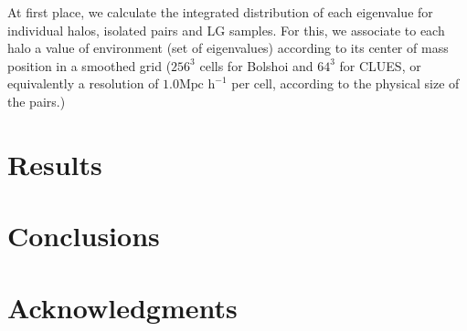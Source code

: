 \documentclass[usenatbib]{mn2e}
\begin{document}
At first place, we calculate the integrated distribution of each 
eigenvalue for individual halos, isolated pairs and LG samples. For this, 
we associate to each halo a value of environment (set of eigenvalues)
according to its center of mass position in a smoothed grid ($256^3$ 
cells for Bolshoi and $64^3$ for CLUES, or equivalently a resolution of 
$1.0 \mbox{Mpc h}^{-1} $ per cell, according to the physical size of the 
pairs.)


\section{Results}
\label{sec:Results}


\section{Conclusions}
\label{sec:conclusions}


\section*{Acknowledgments}  



 
\end{document}
